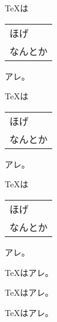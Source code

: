 \documentclass{article}
\begin{document}

{\TeX}は\begin{tabular}[t]{l}ほげ\\なんとか\end{tabular}アレ。
\par\medskip
{\TeX}は\begin{tabular}[c]{l}ほげ\\なんとか\end{tabular}アレ。
\par\medskip
{\TeX}は\begin{tabular}[b]{l}ほげ\\なんとか\end{tabular}アレ。
\par\medskip
{\TeX}はアレ。
\par\medskip
{\TeX}はアレ。
\par\medskip
{\TeX}はアレ。
\par\medskip
\end{document}
